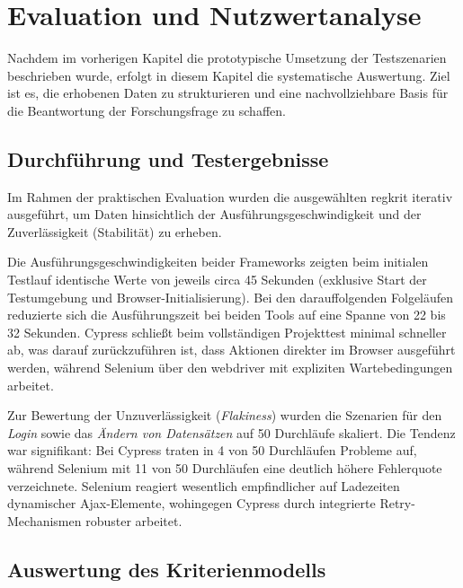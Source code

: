 
\section{Evaluation und Nutzwertanalyse}
\label{ch:evaluation}

Nachdem im vorherigen Kapitel die prototypische Umsetzung der Testszenarien beschrieben wurde, erfolgt in diesem Kapitel die systematische Auswertung. Ziel ist es, die erhobenen Daten zu strukturieren und eine nachvollziehbare Basis für die Beantwortung der Forschungsfrage zu schaffen.

\subsection{Durchführung und Testergebnisse}
\label{sec:testergebnisse}

Im Rahmen der praktischen Evaluation wurden die ausgewählten \gls{regkrit} iterativ ausgeführt, um Daten hinsichtlich der Ausführungsgeschwindigkeit und der Zuverlässigkeit (Stabilität) zu erheben. 

Die Ausführungsgeschwindigkeiten beider Frameworks zeigten beim initialen Testlauf identische Werte von jeweils circa 45 Sekunden (exklusive Start der Testumgebung und Browser-Initialisierung). Bei den darauffolgenden Folgeläufen reduzierte sich die Ausführungszeit bei beiden Tools auf eine Spanne von 22 bis 32 Sekunden. Cypress schließt beim vollständigen Projekttest minimal schneller ab, was darauf zurückzuführen ist, dass Aktionen direkter im Browser ausgeführt werden, während Selenium über den \gls{webdriver} mit expliziten Wartebedingungen arbeitet.

Zur Bewertung der Unzuverlässigkeit (\textit{Flakiness}) wurden die Szenarien für den \textit{Login} sowie das \textit{Ändern von Datensätzen} auf 50 Durchläufe skaliert. Die Tendenz war signifikant: Bei Cypress traten in 4 von 50 Durchläufen Probleme auf, während Selenium mit 11 von 50 Durchläufen eine deutlich höhere Fehlerquote verzeichnete. Selenium reagiert wesentlich empfindlicher auf Ladezeiten dynamischer Ajax-Elemente, wohingegen Cypress durch integrierte Retry-Mechanismen robuster arbeitet.

\subsection{Auswertung des Kriterienmodells}
\label{sec:kriterien_auswertung}

